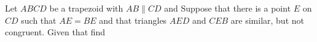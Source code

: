 Let $ABCD$ be a trapezoid with $AB\parallel CD$ and   Suppose that there is a point $E$ on $CD$ such that $AE=BE$ and that triangles $AED$ and $CEB$ are similar, but not congruent.  Given that  find 